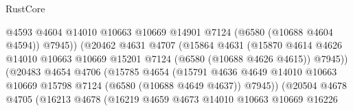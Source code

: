 \begin{lexlean}{RustCore}
\begin{coremodule}
                                          @4593
                                          @4604
                                          @14010
                                          @10663
                                          @10669
                                          @14901
                                          @7124
                                          (@6580 (@10688 @4604 @4594))
                                          @7945))
                                      (@20462
                                        @4631
                                        @4707
                                        (@15864
                                          @4631
                                          (@15870
                                            @4614
                                            @4626
                                            @14010
                                            @10663
                                            @10669
                                            @15201
                                            @7124
                                            (@6580 (@10688 @4626 @4615))
                                            @7945))
                                        (@20483
                                          @4654
                                          @4706
                                          (@15785
                                            @4654
                                            (@15791
                                              @4636
                                              @4649
                                              @14010
                                              @10663
                                              @10669
                                              @15798
                                              @7124
                                              (@6580 (@10688 @4649 @4637))
                                              @7945))
                                          (@20504
                                            @4678
                                            @4705
                                            (@16213
                                              @4678
                                              (@16219
                                                @4659
                                                @4673
                                                @14010
                                                @10663
                                                @10669
                                                @16226

\end{coremodule}
\end{lexlean}
